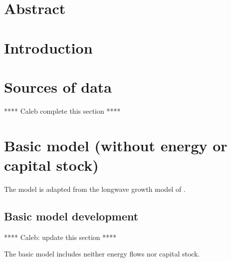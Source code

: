 \documentclass[letterpaper,12pt]{article}
\begin{document}

\section*{Abstract}


\section{Introduction}
\label{sec:introduction}


\section{Sources of data}
\label{sec:sources_of_data}

**** Caleb complete this section ****


\section{Basic model (without energy or capital stock)}
\label{sec:basic_model}

The model is adapted from the longwave growth model of \citet{Jones:2001wn}. 

\subsection{Basic model development}
\label{sec:basic_model_development}

**** Caleb: update this section ****

The basic model includes neither energy flows nor capital stock.
\end{document}
